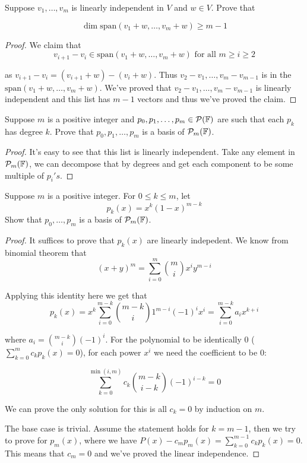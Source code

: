 \documentclass{extarticle}
\begin{document}
\begin{problem}{8}
    Suppose \(v_1, \ldots, v_m\) is linearly independent in \(V\) and \(w \in V\). Prove that 

    \[\dim \text{span} (v_1 + w, \ldots, v_m + w) \geq m - 1\]
\end{problem}

\begin{proof}
We claim that 
\[v_{i+1} - v_i \in \text{span}(v_1 + w, \ldots, v_m + w) \text{ for all } m \geq i \geq 2\]

as \(v_{i+1} - v_i = (v_{i+1} + w) - (v_i + w)\). Thus \(v_2 - v_1, \ldots, v_m - v_{m-1}\) is 
in the \(\text{span}(v_1 + w, \ldots, v_m + w)\). We've proved that \(v_2 - v_1, \ldots, v_m - v_{m-1}\)
is linearly independent and this list has \(m - 1\) vectors and thus we've proved the claim.

\end{proof}


\begin{problem}{9}
    Suppose \(m\) is a positive integer and \(p_0, p_1, \ldots, p_m \in \mathcal{P}(\mathbb{F})\) are 
    such that each \(p_k\) has degree \(k\). Prove that \(p_0, p_1, \ldots, p_m\) 
    is a basis of \(\mathcal{P}_m (\mathbb{F})\).
\end{problem}

\begin{proof}
It's easy to see that this list is linearly independent. Take any element in \(\mathcal{P}_m (\mathbb{F})\),
we can decompose that by degrees and get each component to be some multiple of \(p_i's\).
\end{proof}

\begin{problem}{10}
    Suppose \(m\) is a positive integer. For \(0 \leq k \leq m\), let 
    \[p_k(x) = x^k (1 - x)^{m - k}\]
    Show that \(p_0, \ldots, p_m\) is a basis of \(\mathcal{P}_m(\mathbb{F})\). 
\end{problem}

\begin{proof}
It suffices to prove that \(p_k(x)\) are linearly indepedent. We know from binomial theorem 
that 
\[(x+y)^m = \sum_{i=0}^{m} {m \choose i} x^i y^{m-i} \]

Applying this identity here we get that 
\[p_k(x) = x^k \sum_{i=0}^{m-k} {m-k \choose i} 1^{m-i} (-1)^{i} x^{i} = \sum_{i=0}^{m-k}
a_i x^{k + i}\]

where \(a_i = {m - k \choose i} (-1)^i\). For the polynomial to be identically 0 (\(\sum_{k=0}^{m}c_k p_k (x) = 0\)), for each 
power \(x^i\) we need the coefficient to be 0:

\[\sum_{k=0}^{\min(i, m)} c_k {m - k \choose i - k} (-1)^{i - k} = 0\]

We can prove the only solution for this is all \(c_k = 0\) by induction on \(m\). 

The base case is trivial. Assume the statement holds for \(k = m - 1\), then we try 
to prove for \(p_m(x)\), where we have \(P(x) - c_m p_m (x) = \sum_{k=0}^{m-1}c_kp_k(x)=0\). 
This means that \(c_m = 0\) and we've proved the linear independence. 

\end{proof}
\end{document}
